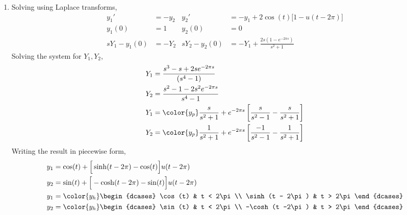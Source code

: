 \begin{enumerate}
    \item Solving using Laplace transforms,
          \begin{align}
              y_1'          & = -y_2                                       &
              y_2'          & = -y_1 + 2\cos(t)\Big[1 - u(t - 2\pi)\Big]     \\
              y_1(0)        & = 1                                          &
              y_2(0)        & = 0                                            \\
              sY_1 - y_1(0) & = -Y_2                                       &
              sY_2 - y_2(0) & = -Y_1 + \frac{2s(1 - e^{-2\pi s})}{s^2 + 1}
          \end{align}
          Solving the system for $ Y_1, Y_2 $,
          \begin{align}
              Y_1 & = \frac{s^3 - s + 2s e^{-2\pi s}}{(s^4 - 1)}    \\
              Y_2 & = \frac{s^2 - 1 - 2s^2 e^{-2\pi s}}{s^4 - 1}    \\
              Y_1 & = \color{y_p} \frac{s}{s^2 + 1} + e^{-2\pi s}
              \left[ \frac{s}{s^2 - 1} - \frac{s}{s^2 + 1} \right]  \\
              Y_2 & = \color{y_p} \frac{1}{s^2 + 1} + e^{-2 \pi s}
              \left[ \frac{-1}{s^2 - 1} - \frac{1}{s^2 + 1} \right] \\
          \end{align}
          Writing the result in piecewise form,
          \begin{align}
              y_1 & = \cos(t) + \Big[ \sinh(t - 2\pi) - \cos(t) \Big]
              u(t - 2\pi)                                              \\
              y_2 & = \sin(t) + \Big[ -\cosh(t - 2\pi) - \sin(t) \Big]
              u(t - 2\pi)                                              \\
              y_1 & = \color{y_h}
              \begin{dcases}
                  \cos(t)         & t < 2\pi \\
                  \sinh(t - 2\pi) & t > 2\pi
              \end{dcases}                               \\
              y_2 & = \color{y_h}
              \begin{dcases}
                  \sin(t)         & t < 2\pi \\
                  -\cosh(t -2\pi) & t > 2\pi
              \end{dcases}
          \end{align}


\end{enumerate}
